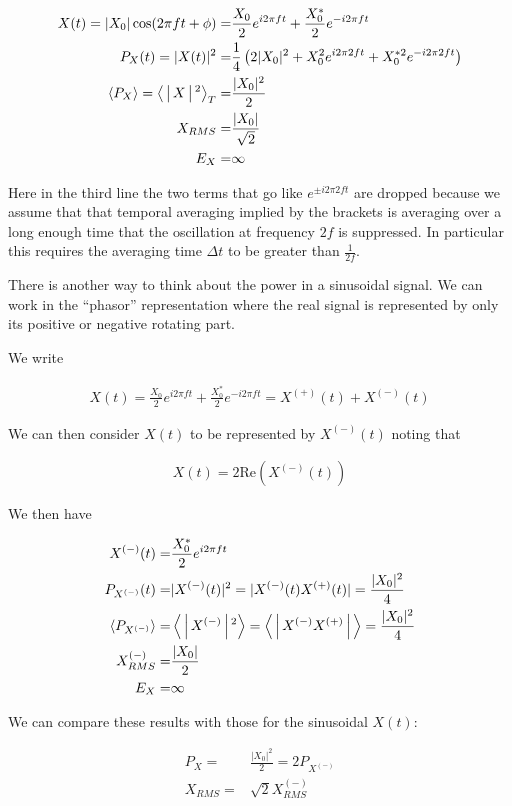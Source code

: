 \documentclass[12pt]{article}
\begin{document}
\begin{align}
X(t) = |X_0|\cos(2\pi f t + \phi) =& \frac{X_0}{2} e^{i2\pi f t} + \frac{X_0^*}{2} e^{-i2\pi ft}\\
P_X(t) = |X(t)|^2 =& \frac{1}{4}\left(2|X_0|^2 + X_0^2e^{i2\pi 2f t} + X_0^{*2}e^{-i2\pi 2ft}\right)\\
\Braket{P_X} = \Braket{|X|^2}_T =& \frac{|X_0|^2}{2}\\
X_{RMS} =& \frac{|X_0|}{\sqrt{2}}\\
E_X =& \infty
\end{align}

Here in the third line the two terms that go like $e^{\pm i 2\pi 2f t}$ are dropped because we assume that that temporal averaging implied by the brackets is averaging over a long enough time that the oscillation at frequency $2f$ is suppressed. 
In particular this requires the averaging time $\Delta t$ to be greater than $\frac{1}{2f}$.

There is another way to think about the power in a sinusoidal signal.
We can work in the ``phasor'' representation where the real signal is represented by only its positive or negative rotating part. 

We write

\begin{align}
X(t) = \frac{X_0}{2}e^{i2\pi ft} + \frac{X_0^*}{2}e^{-i2\pi f t} = X^{(+)}(t) + X^{(-)}(t)
\end{align}

We can then consider $X(t)$ to be represented by $X^{(-)}(t)$ noting that 

\begin{align}
X(t) = 2 \text{Re}\left(X^{(-)}(t)\right)
\end{align}

We then have

\begin{align}
X^{(-)}(t) =& \frac{X_0^*}{2}e^{i2\pi ft}\\
P_{X^{(-)}}(t) =& |X^{(-)}(t)|^2 = |X^{(-)}(t)X^{(+)}(t)| = \frac{|X_0|^2}{4}\\
\Braket{P_{X^{(-)}}} =& \Braket{|X^{(-)}|^2} = \Braket{|X^{(-)}X^{(+)}|} = \frac{|X_0|^2}{4}\\
X^{(-)}_{RMS} =& \frac{|X_0|}{2}\\
E_X =& \infty
\end{align}

We can compare these results with those for the sinusoidal $X(t)$:

\begin{align}
P_X =& \frac{|X_0|^2}{2} = 2P_{X^{(-)}}\\
X_{RMS} =& \sqrt{2} X^{(-)}_{RMS}
\end{align}
\end{document}
